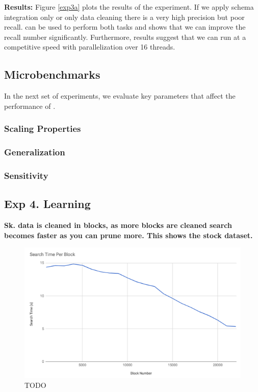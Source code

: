 \vspace{0.5em}\noindent\textbf{Results: } Figure \ref{exp3a} plots the results of the experiment. If we apply schema integration only or only data cleaning there is a very high precision but poor recall. \sys can be used to perform both tasks and shows that we can improve the recall number significantly.
Furthermore, results suggest that we can run \sys at a competitive speed with parallelization over 16 threads.

\subsection{Microbenchmarks}
In the next set of experiments, we evaluate key parameters that affect the performance of \sys.

\subsubsection{Scaling Properties}


\subsubsection{Generalization}


\subsubsection{Sensitivity}





\subsection{Exp 4. Learning}

\textbf{Sk. data is cleaned in blocks, as more blocks are cleaned search becomes faster as you can prune more. This shows the stock dataset.}

 \begin{figure}[ht]
\centering
 \includegraphics[width=0.9\columnwidth]{figures/draft-blocks.png}
 \caption{TODO
 \label{fig:opt}}
\end{figure}


